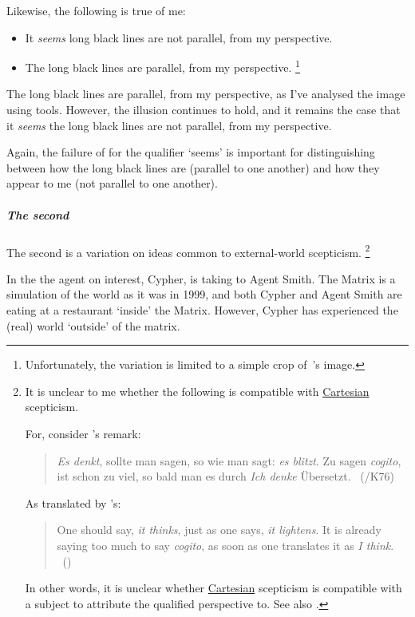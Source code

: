 \begin{note}
  Likewise, the following is true of me:

  \begin{itemize}[noitemsep]
  \item
    It \emph{seems} long black lines are not parallel, from my perspective.
  \item
    The long black lines are parallel, from my perspective.%
    \footnote{
      Unfortunately, the variation is limited to a simple crop of~\textcite{Fibonacci:2007vj}'s image.
    }
  \end{itemize}

  The long black lines are parallel, from my perspective, as I've analysed the image using tools.
  However, the illusion continues to hold, and it remains the case that it \emph{seems} the long black lines are not parallel, from my perspective.

  Again, the failure of \ptivity{} for the qualifier `seems' is important for distinguishing between how the long black lines are (parallel to one another) and how they appear to me (not parallel to one another).
\end{note}

\subparagraph{The second }

\begin{note}
  The second  is a variation on ideas common to external-world scepticism.%
  \footnote{
    It is unclear to me whether the following  is compatible with \hyperlink{cite.Descartes:1996vp}{Cartesian} scepticism.

    For, consider \citeauthor{Lichtenberg:1991tf}'s remark:

    \begin{quote}
      \emph{Es denkt}, sollte man sagen, so wie man sagt: \emph{es blitzt}.
      Zu sagen \emph{cogito}, ist schon zu viel, so bald man es durch \emph{Ich denke} \"{U}bersetzt.
      \mbox{ }\hfill\mbox{(\citeyear[412]{Lichtenberg:1991tf}/K76)}
    \end{quote}

    As translated by \citeauthor{Zoller:1992ud}'s:

    \begin{quote}
      One should say, \emph{it thinks}, just as one says, \emph{it lightens}.
      It is already saying too much to say \emph{cogito}, as soon as one translates it as \emph{I think}.
      \mbox{ }\hfill\mbox{(\citeyear[418]{Zoller:1992ud})}
    \end{quote}

    In other words, it is unclear whether \hyperlink{cite.Descartes:1996vp}{Cartesian} scepticism is compatible with a subject to attribute the qualified perspective to.
    See also \textcite{Perry:1986aa}.
  }
  \nocite{Harman:1973ww}

  In the  the agent on interest, Cypher, is taking to Agent Smith.
  The Matrix is a simulation of the world as it was in 1999, and both Cypher and Agent Smith are eating at a restaurant `inside' the Matrix.
  However, Cypher has experienced the (real) world `outside' of the matrix.
\end{note}

